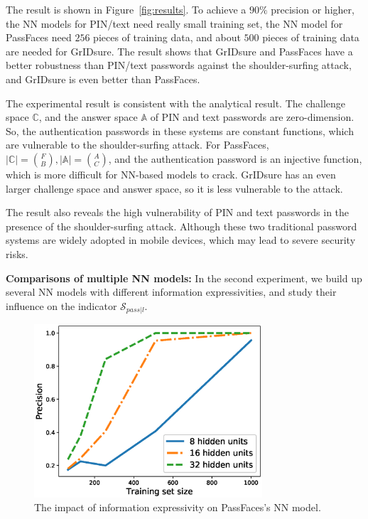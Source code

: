 \documentclass{article}
\begin{document}
The result is shown in Figure~\ref{fig:results}. To achieve a $90\%$ precision or higher, the NN models for PIN/text need really small training set, the NN model for PassFaces need $256$ pieces of training data, and about $500$ pieces of training data are needed for GrIDsure. The result shows that GrIDsure and PassFaces have a better robustness than PIN/text passwords against the shoulder-surfing attack, and GrIDsure is even better than PassFaces.

The experimental result is consistent with the analytical result. The challenge space $\mathbb{C}$, and the answer space $\mathbb{A}$ of PIN and text passwords are zero-dimension. So, the authentication passwords in these systems are constant functions, which are vulnerable to the shoulder-surfing attack. For PassFaces,
$|\mathbb{C}| = \binom{F}{B}, |\mathbb{A}| = \binom{A}{C}$,
and the authentication password is an injective function, which is more difficult for NN-based models to crack. GrIDsure has an even larger challenge space and answer space, so it is less vulnerable to the attack.

  The result also reveals the high vulnerability of PIN and text passwords in the presence of the shoulder-surfing attack. Although these two traditional password systems are widely adopted in mobile devices, which may lead to severe security risks.


\textbf{Comparisons of multiple NN models:}
In the second experiment, we build up several NN models with different information expressivities, and study their influence on the indicator $\mathcal{S}_{pass|l}$.
  \begin{figure}[htb]
    \centering
    \includegraphics[width=8.5cm]{passfaces}
    \caption{The impact of information expressivity on PassFaces's NN model. }
    \label{fig:results2}
  \end{figure}
\end{document}
